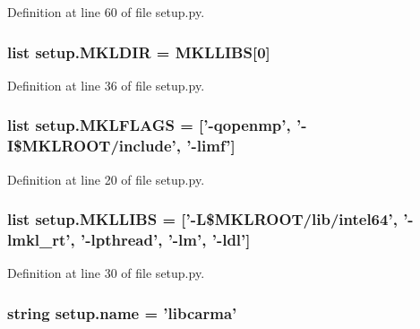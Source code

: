 Definition at line 60 of file setup.\-py.

\hypertarget{namespacesetup_a71664edfdcf98a1ed2159a5cb4a7d196}{
\subsubsection[{M\-K\-L\-D\-I\-R}]{\setlength{\rightskip}{0pt plus 5cm}list setup.\-M\-K\-L\-D\-I\-R = {\bf M\-K\-L\-L\-I\-B\-S}\mbox{[}0\mbox{]}}}\label{namespacesetup_a71664edfdcf98a1ed2159a5cb4a7d196}


Definition at line 36 of file setup.\-py.

\hypertarget{namespacesetup_a356d52830aa81f3e0cfda1095f3162f8}{
\subsubsection[{M\-K\-L\-F\-L\-A\-G\-S}]{\setlength{\rightskip}{0pt plus 5cm}list setup.\-M\-K\-L\-F\-L\-A\-G\-S = \mbox{[}'-\/qopenmp', '-\/I\$\-M\-K\-L\-R\-O\-O\-T/include', '-\/limf'\mbox{]}}}\label{namespacesetup_a356d52830aa81f3e0cfda1095f3162f8}


Definition at line 20 of file setup.\-py.

\hypertarget{namespacesetup_a3ecd92f8e1e53dd6528359a08aee59e9}{
\subsubsection[{M\-K\-L\-L\-I\-B\-S}]{\setlength{\rightskip}{0pt plus 5cm}list setup.\-M\-K\-L\-L\-I\-B\-S = \mbox{[}'-\/L\$\-M\-K\-L\-R\-O\-O\-T/lib/intel64', '-\/lmkl\-\_\-rt', '-\/lpthread', '-\/lm', '-\/ldl'\mbox{]}}}\label{namespacesetup_a3ecd92f8e1e53dd6528359a08aee59e9}


Definition at line 30 of file setup.\-py.

\hypertarget{namespacesetup_a61de3710bf6c9d78c0afa352263f8b09}{
\subsubsection[{name}]{\setlength{\rightskip}{0pt plus 5cm}string setup.\-name = 'libcarma'}}\label{namespacesetup_a61de3710bf6c9d78c0afa352263f8b09}


